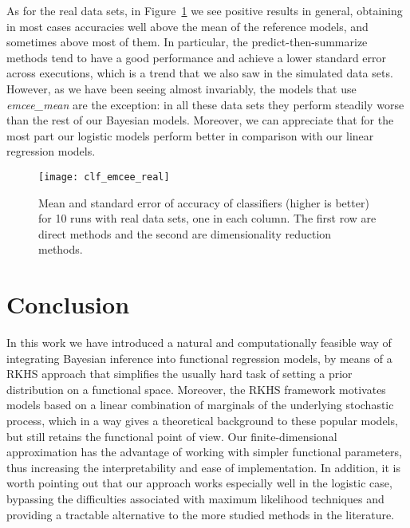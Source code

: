 \documentclass{article}
\numberwithin{equation}{section}
\theoremstyle{plain}
\begin{document}
As for the real data sets, in Figure~\ref{fig:clf_emcee_real} we see positive results in general, obtaining in most cases accuracies well above the mean of the reference models, and sometimes above most of them. In particular, the predict-then-summarize methods tend to have a good performance and achieve a lower standard error across executions, which is a trend that we also saw in the simulated data sets. However, as we have been seeing almost invariably, the models that use \textit{emcee\_mean} are the exception: in all these data sets they perform steadily worse than the rest of our Bayesian models. Moreover, we can appreciate that for the most part our logistic models perform better in comparison with our linear regression models.

\begin{figure}[ht!]
  \centering
  \texttt{[image: clf\_emcee\_real]}
  \caption{Mean and standard error of accuracy of classifiers (higher is better) for 10 runs with real data sets, one in each column. The first row are direct methods and the second are dimensionality reduction methods.}\label{fig:clf_emcee_real}
\end{figure}


\section{Conclusion}\label{sec:conclusion}

In this work we have introduced a natural and computationally feasible way of integrating Bayesian inference into functional regression models, by means of a RKHS approach that simplifies the usually hard task of setting a prior distribution on a functional space. Moreover, the RKHS framework motivates models based on a linear combination of marginals of the underlying stochastic process, which in a way gives a theoretical background to these popular models, but still retains the functional point of view. Our finite-dimensional approximation has the advantage of working with simpler functional parameters, thus increasing the interpretability and ease of implementation. In addition, it is worth pointing out that our approach works especially well in the logistic case, bypassing the difficulties associated with maximum likelihood techniques and providing a tractable alternative to the more studied methods in the literature.
\end{document}
